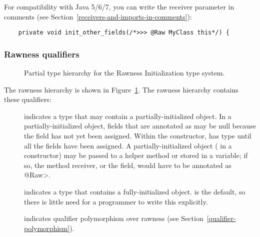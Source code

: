For compatibility with Java 5/6/7, you can write the receiver
parameter in comments (see Section~\ref{receivers-and-imports-in-comments}):
\begin{Verbatim}
    private void init_other_fields(/*>>> @Raw MyClass this*/) {
\end{Verbatim}


\subsubsection{Rawness qualifiers\label{rawness-qualifiers}}

\begin{figure}
\caption{Partial type hierarchy for the Rawness Initialization type system.}
\label{fig-rawness-hierarchy}
\end{figure}

The rawness hierarchy is shown in Figure~\ref{fig-rawness-hierarchy}.
The rawness hierarchy contains these qualifiers:

\begin{description}

\item[]
  indicates a type that may contain a partially-initialized object.  In a
  partially-initialized object, fields that are annotated as
   may be null because the field
  has not yet been assigned.  Within the constructor,
   has  type until all
  the  fields have been assigned.
  A partially-initialized object ( in a constructor) may be
  passed to a helper method or stored in a variable; if so, the method
  receiver, or the field, would have to be annotated as \<@Raw>.

\item[]
  indicates a type that contains a fully-initialized object.  
  is the default, so there is little need for a programmer to write this
  explicitly.

\item[]
  indicates qualifier polymorphism over rawness (see
  Section~\ref{qualifier-polymorphism}).

\end{description}


